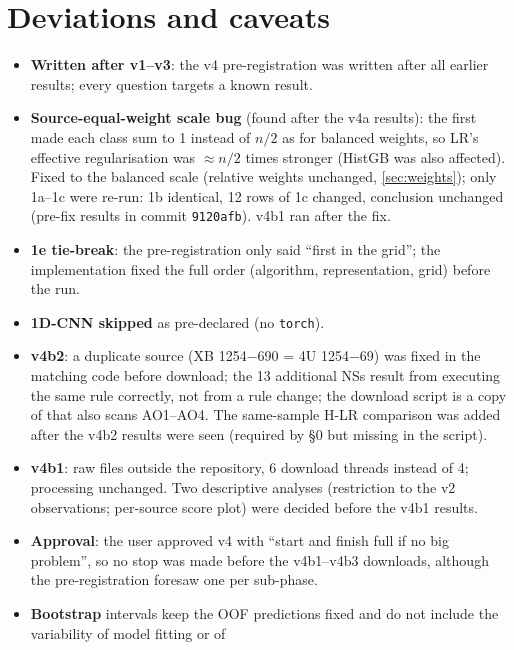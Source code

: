 \section{Deviations and caveats}\label{sec:p2caveats}
\begin{itemize}
\item \textbf{Written after v1--v3}: the v4 pre-registration was written after all earlier results; every question
targets a known result.
\item \PostHoc{} \textbf{Source-equal-weight scale bug} (found after the v4a results): the first
 made each class sum to 1 instead of $n/2$ as for balanced weights, so LR's effective
regularisation was $\approx n/2$ times stronger (HistGB was also affected). Fixed to the balanced scale (relative weights
unchanged, \cref{sec:weights}); only 1a--1c were re-run: 1b identical, 12 rows of 1c changed, conclusion unchanged
(pre-fix results in commit \texttt{9120afb}). v4b1 ran after the fix.
\item \textbf{1e tie-break}: the pre-registration only said ``first in the grid''; the implementation fixed the full order
(algorithm, representation, grid) before the run.
\item \textbf{1D-CNN skipped} as pre-declared (no \texttt{torch}).
\item \textbf{v4b2}: a duplicate source (XB 1254$-$690 = 4U 1254$-$69) was fixed in the matching code before download; the
13 additional NSs result from executing the same rule correctly, not from a rule change; the download script
 is a copy of  that also scans AO1--AO4. The same-sample H-LR
comparison was added after the v4b2 results were seen (required by \S0 but missing in the script).
\item \textbf{v4b1}: raw files outside the repository, 6 download threads instead of 4; processing unchanged. Two descriptive
analyses (restriction to the v2 observations; per-source score plot) were decided before the v4b1 results.
\item \textbf{Approval}: the user approved v4 with ``start and finish full if no big problem'', so no stop was made before
the v4b1--v4b3 downloads, although the pre-registration foresaw one per sub-phase.
\item \textbf{Bootstrap} intervals keep the OOF predictions fixed and do not include the variability of model fitting or of

\end{itemize}

